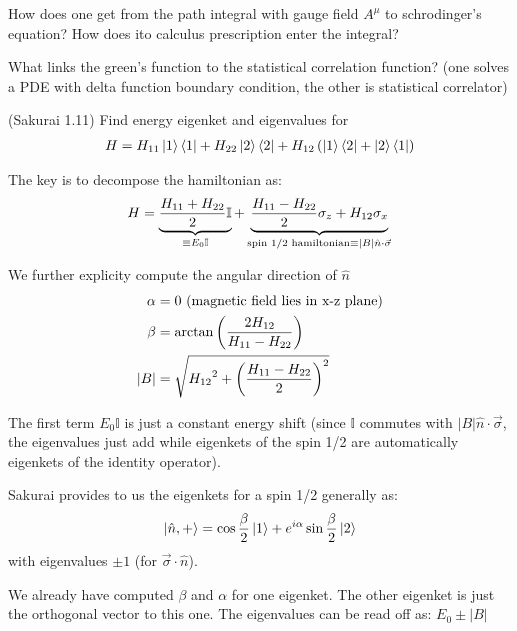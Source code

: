 \documentclass[10pt]{scrartcl}
\begin{document}
\begin{myquestion}
	How does one get from the path integral with gauge field $A^\mu$ to schrodinger's equation?  How does ito calculus prescription enter the integral?
\end{myquestion}


\begin{myquestion}
What links the green's function to the statistical correlation function? (one solves a PDE with delta function boundary condition, the other is statistical correlator)
	\end{myquestion}

\begin{myquestion}
(Sakurai 1.11) Find energy eigenket and eigenvalues for
\begin{align}
	H = H_{11} \ket{1} \bra{1} + H_{22} \ket{2} \bra{2} + H_{12} \left(\ket{1} \bra{2} + \ket{2} \bra{1} \right) 
	\end{align}

	\end{myquestion}

The key is to decompose the hamiltonian as:
\[ H = \underbrace{{H_{11} + H_{22} \over 2} \mathbb{I} }_{\equiv E_0 \mathbb{I}}+ \underbrace{{H_{11} - H_{22} \over 2} \sigma_z + H_{12} \sigma_x}_{\text{spin 1/2 hamiltonian} \equiv |B| \hat{n} \cdot \vec{\sigma}} \]

We further explicity compute the angular direction of $\hat{n}$
\begin{align}
	\alpha &= 0 \text{  (magnetic field lies in x-z plane)} \\
	\beta &= \arctan \left({2 H_{12} \over H_{11} - H_{22}} \right) \\
	|B| &= \sqrt{{H_{12}}^2 + \left({H_{11} - H_{22} \over 2} \right)^2}
	\end{align}

The first term $E_0 \mathbb{I}$ is just a constant energy shift (since $\mathbb{I}$ commutes with $|B| \hat{n} \cdot \vec{\sigma}$, the eigenvalues just add while eigenkets of the spin 1/2 are automatically eigenkets of the identity operator).

Sakurai provides to us the eigenkets for a spin 1/2 generally as:
\[ \ket{\hat{n}, +} = \cos {\beta \over 2} \ket{1} + e^{i \alpha} \sin{{\beta \over 2}} \ket{2}	\]
with eigenvalues $\pm 1$ (for $\vec{\sigma} \cdot \hat{n}$).

We already have computed $\beta$ and $\alpha$ for one eigenket.  The other eigenket is just the orthogonal vector to this one.
 The eigenvalues can be read off as:
$E_0 \pm |B|$
\end{document}

